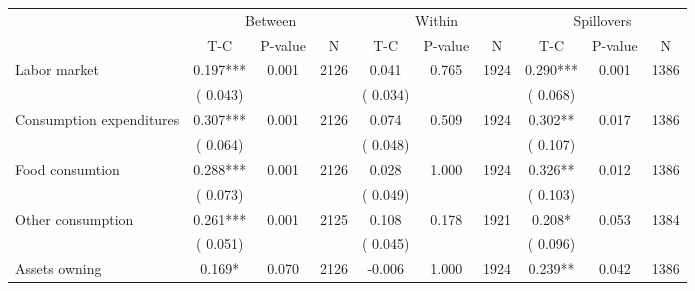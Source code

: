 
\begin{tabular}{l*{9}{c}}\hline&\multicolumn{3}{c}{Between}&\multicolumn{3}{c}{Within}&\multicolumn{3}{c}{Spillovers} \\ \cmidrule(r){2-4}\cmidrule(l){5-7}\cmidrule(l){8-10} & {T-C} & {P-value} & {N} & {T-C} & {P-value} & {N}  & {T-C} & {P-value} & {N}  \\ \midrule
 Labor market                 &              0.197***          &        0.001 & 2126          &              0.041          &        0.765 & 1924          &        0.290*** &        0.001 & 1386                 \\ 
                               &        (       0.043) & &                                                                 &       (       0.034) & &                                                          &       (       0.068)      & &     \\ 
 Consumption expenditures                 &              0.307***          &        0.001 & 2126          &              0.074 &        0.509 & 1924                   &        0.302** &        0.017 & 1386                 \\ 
                               &        (       0.064) & &                                                                 &       (       0.048) & &                                                          &       (       0.107) & &  \\ 
 Food consumtion                 &              0.288***          &        0.001 & 2126          &              0.028 &        1.000 & 1924                   &        0.326** &        0.012 & 1386                 \\ 
                               &        (       0.073) & &                                                                 &       (       0.049) & &                                                          & (       0.103)                                    \\ 
 Other consumption                 &              0.261***          &        0.001 & 2125          &              0.108 &        0.178 & 1921                   &        0.208* &        0.053 & 1384                 \\ 
                               &        (       0.051) & &                                                                 &       (       0.045) & &                                                          &       (       0.096) & &   \\ 
 Assets owning                 &              0.169*          &        0.070 & 2126          &             -0.006 &        1.000 & 1924                   &        0.239** &        0.042 & 1386                 \\ 

\end{tabular}
